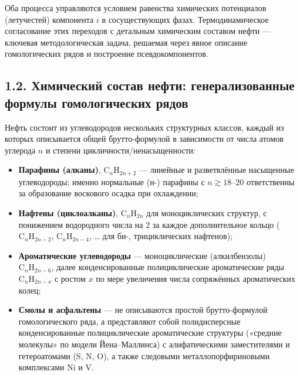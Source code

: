 \documentclass[11pt]{extarticle}
\providecommand{\tightlist}{\setlength{\itemsep}{0pt}\setlength{\parskip}{0pt}}
\begin{document}
Оба процесса управляются условием равенства химических потенциалов (летучестей) компонента \(i\) в сосуществующих фазах. Термодинамическое согласование этих переходов с детальным химическим составом нефти --- ключевая методологическая задача, решаемая через явное описание гомологических рядов и построение псевдокомпонентов.

\subsection{1.2. Химический состав нефти: генерализованные формулы гомологических рядов}\label{ux445ux438ux43cux438ux447ux435ux441ux43aux438ux439-ux441ux43eux441ux442ux430ux432-ux43dux435ux444ux442ux438-ux433ux435ux43dux435ux440ux430ux43bux438ux437ux43eux432ux430ux43dux43dux44bux435-ux444ux43eux440ux43cux443ux43bux44b-ux433ux43eux43cux43eux43bux43eux433ux438ux447ux435ux441ux43aux438ux445-ux440ux44fux434ux43eux432}

Нефть состоит из углеводородов нескольких структурных классов, каждый из которых описывается общей брутто-формулой в зависимости от числа атомов углерода \(n\) и степени цикличности/ненасыщенности:

\begin{itemize}
\tightlist
\item
  \textbf{Парафины (алканы)}, \(\mathrm{C}_n\mathrm{H}_{2n+2}\) --- линейные и разветвлённые насыщенные углеводороды; именно нормальные (н-) парафины с \(n \gtrsim 18\)--20 ответственны за образование воскового осадка при охлаждении;
\item
  \textbf{Нафтены (циклоалканы)}, \(\mathrm{C}_n\mathrm{H}_{2n}\) для моноциклических структур, с понижением водородного числа на 2 за каждое дополнительное кольцо (\(\mathrm{C}_n\mathrm{H}_{2n-2}\), \(\mathrm{C}_n\mathrm{H}_{2n-4}\), \ldots{} для би-, трициклических нафтенов);
\item
  \textbf{Ароматические углеводороды} --- моноциклические (алкилбензолы) \(\mathrm{C}_n\mathrm{H}_{2n-6}\), далее конденсированные полициклические ароматические ряды \(\mathrm{C}_n\mathrm{H}_{2n-x}\) с ростом \(x\) по мере увеличения числа сопряжённых ароматических колец;
\item
  \textbf{Смолы и асфальтены} --- не описываются простой брутто-формулой гомологического ряда, а представляют собой полидисперсные конденсированные полициклические ароматические структуры («средние молекулы» по модели Йена--Маллинса) с алифатическими заместителями и гетероатомами (S, N, O), а также следовыми металлопорфириновыми комплексами Ni и V.
\end{itemize}
\end{document}
